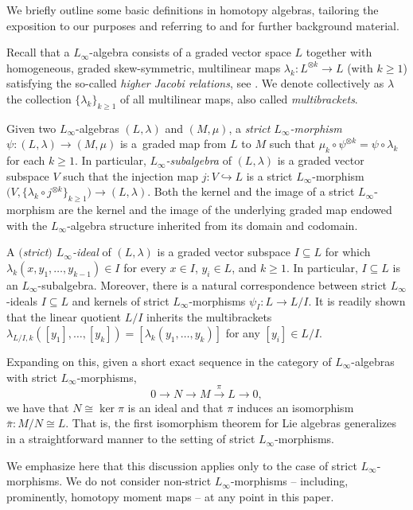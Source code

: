\documentclass[10pt,a4paper]{amsart}
\numberwithin{equation}{section}
\renewcommand{\subset}{\subseteq}
\begin{document}
\begin{Remark}
We briefly outline some basic definitions in homotopy algebras, tailoring the exposition to our purposes and referring to \cite{LadaMarkl95} and \cite[Section~3]{Lazarev14} for further background material.

Recall that a $L_\infty$-algebra consists of a graded vector space $L$ together with homogeneous, graded skew-symmetric, multilinear maps $\lambda_k\colon L^{\otimes k} \to L$ (with $k\geq 1$) satisfying the so-called \emph{higher Jacobi relations}, see \cite[Definition~2.1]{LadaMarkl95}.
We denote collectively as $\lambda$ the collection $\{\lambda_k\}_{k\geq 1}$ of all multilinear maps, also called \emph{multibrackets}.

Given two $L_\infty$-algebras $(L,\lambda)$ and $(M,\mu)$, a \emph{strict $L_\infty$-morphism} $\psi\colon  (L,\lambda)\to(M,\mu)$ is a~graded map from $L$ to $M$ such that $\mu_k\circ \psi^{\otimes k} = \psi \circ \lambda_k$ for each $k\geq 1$. In particular, \emph{$L_\infty$-subalgebra} of $(L,\lambda)$ is a graded vector subspace $V$ such that the injection map $j\colon V\hookrightarrow L$ is a strict $L_\infty$-morphism $\bigl(V,\bigl\{\lambda_k\circ j^{\otimes k}\bigr\}_{k\geq 1}\bigr)\to (L,\lambda)$. Both the kernel and the image of a strict $L_\infty$-morphism are the kernel and the image of the underlying graded map endowed with the $L_\infty$-algebra structure inherited from its domain and codomain.

A \emph{$($strict$)$ $L_\infty$-ideal} of $(L,\lambda)$ is a graded vector subspace $I\subset L$ for which ${\lambda_k(x,y_1,\dots,y_{k{-}1})\! \in\! I}$ for every $x\in I$, $y_i \in L$, and $k\geq 1$. In particular, $I\subset L$ is an $L_\infty$-subalgebra. Moreover, there is a natural correspondence between strict $L_\infty$-ideals $I\subset L$ and kernels of strict $L_\infty$-morphisms $\psi_I\colon L\to L/I$. It is readily shown that the linear quotient $L/I$ inherits the multibrackets $\lambda_{L/I,k}([y_1],\dots,[y_k])=[\lambda_k(y_1,\dots, y_k)]$ for any $[y_i]\in L/I$.

Expanding on this, given a short exact sequence in the category of $L_\infty$-algebras with strict $L_\infty$-morphisms,
\[
	0\to N\to M \xrightarrow{\pi} L \to 0
	,
\]
we have that $N \cong \ker\pi$ is an ideal and that $\pi$ induces an isomorphism $\bar\pi\colon M/N \cong L$. That is, the first isomorphism theorem for Lie algebras generalizes in a straightforward manner to the setting of strict $L_\infty$-morphisms.

We emphasize here that this discussion applies only to the case of strict $L_\infty$-morphisms. We do not consider non-strict $L_\infty$-morphisms -- including, prominently, homotopy moment maps -- at any point in this paper.
\end{Remark}
\end{document}
